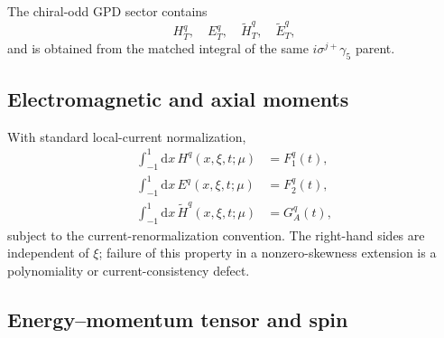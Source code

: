 \documentclass[11pt]{article}
\newcommand{\dd}{\mathrm{d}}
\begin{document}
The chiral-odd GPD sector contains
\begin{equation}
 H_T^q,
 \quad E_T^q,
 \quad\widetilde H_T^q,
 \quad\widetilde E_T^q,
\label{eq:chiral-odd-gpds}
\end{equation}
and is obtained from the matched integral of the same
\(i\sigma^{j+}\gamma_5\) parent.

\subsection{Electromagnetic and axial moments}

With standard local-current normalization,
\begin{align}
 \int_{-1}^{1}\dd x\,H^q(x,\xi,t;\mu)&=F_1^q(t),
\label{eq:h-f1-sum}\\
 \int_{-1}^{1}\dd x\,E^q(x,\xi,t;\mu)&=F_2^q(t),
\label{eq:e-f2-sum}\\
 \int_{-1}^{1}\dd x\,\widetilde H^q(x,\xi,t;\mu)&=G_A^q(t),
\label{eq:htilde-ga-sum}
\end{align}
subject to the current-renormalization convention.  The right-hand sides are
independent of \(\xi\); failure of this property in a nonzero-skewness
extension is a polynomiality or current-consistency defect.

\subsection{Energy--momentum tensor and spin}
\end{document}
